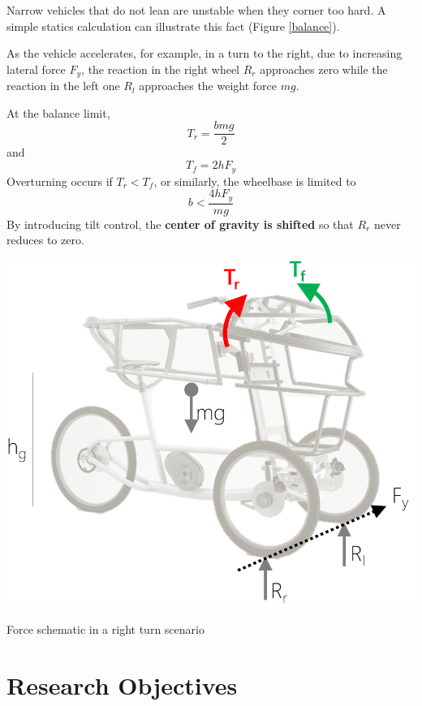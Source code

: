 Narrow vehicles that do not lean are unstable when they corner too hard. A simple statics calculation can illustrate this fact (Figure \ref{balance}).  

As the vehicle accelerates, for example, in a turn to the right, due to increasing lateral force $F_y$, the reaction in the right wheel $R_r$ approaches zero while the reaction in the left one $R_{l}$ approaches the weight force $mg$. 

At the balance limit, \[T_{r} = \frac{bmg}{2}\] and \[T_{f} = 2hF_{y}\]Overturning occurs if $T_{r} < T_{f}$, or similarly, the wheelbase is limited to \[b < \frac{4hF_{y}}{mg}\]By introducing tilt control, the \textbf{center of gravity is shifted} so that $R_r$ never reduces to zero. 

\begin{marginfigure}[-1cm]
	\includegraphics[width=1.3\linewidth]{figs/01/pev_7}
	\caption{Force schematic in a right turn scenario}
	\label{balance}
\end{marginfigure}

\newpage
\section{Research Objectives}

